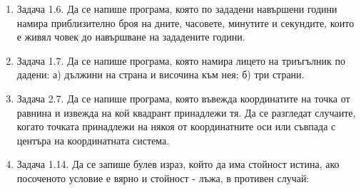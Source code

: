 \documentclass[12pt,a4paper]{article}
\begin{document}
\begin{enumerate}[resume]

	\item Задача 1.6.\cite{sbornik} Да се напише програма, която по зададени навършени години намира приблизително броя на дните, часовете, минутите и секундите, които е живял човек до навършване на зададените години.

	\item Задача 1.7.\cite{sbornik} Да се напише програма, която намира лицето на триъгълник по дадени: а) дължини на страна и височина към нея; б) три страни.


	\item Задача 2.7.\cite{sbornik} Да се напише програма, която въвежда координатите на точка от равнина и извежда на кой квадрант принадлежи тя. Да се разгледат случаите, когато точката принадлежи на някоя от координатните оси или съвпада с центъра на координатната система.

	\item Задача 1.14.\cite{sbornik} Да се запише булев израз, който да има стойност истина, ако посоченото условие е вярно и стойност - лъжа, в противен случай:

	\renewcommand{\theenumii}{\Alph{enumii}}


\end{enumerate}
\end{document}
